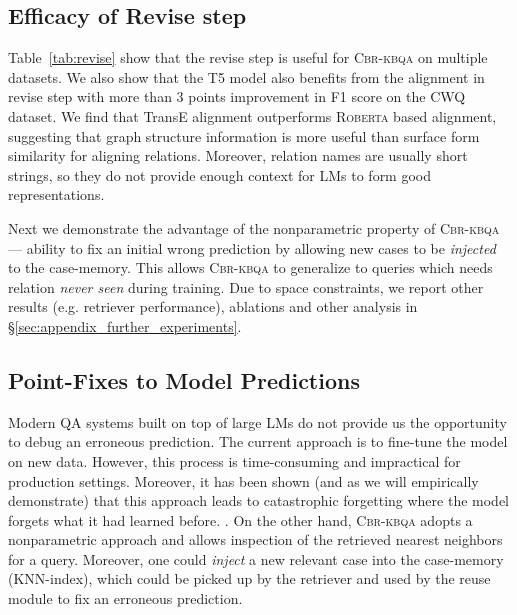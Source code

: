 \documentclass[11pt]{article}
\newcommand{\roberta}{\textsc{Roberta}\xspace}
\newcommand{\alg}{\textsc{Cbr-kbqa}\xspace}
\begin{document}
\subsection{Efficacy of Revise step}
\label{sub:revise_step}
Table~\ref{tab:revise} show that the revise step is useful for \alg on multiple datasets. We also show that the T5 model also benefits from the alignment in revise step with more than 3 points improvement in F1 score on the CWQ dataset. We find that TransE alignment outperforms \roberta based alignment, suggesting that graph structure information is more useful than surface form similarity for aligning relations. Moreover, relation names are usually short strings, so they do not provide enough context for LMs to form good representations.

Next we demonstrate the advantage of the nonparametric property of \alg --- ability to fix an initial wrong prediction by allowing new cases to be \emph{injected} to the case-memory. This allows \alg to generalize to queries which needs relation \emph{never seen} during training. Due to space constraints, we report other results (e.g. retriever performance), ablations and other analysis in \S\ref{sec:appendix_further_experiments}. 


\subsection{Point-Fixes to Model Predictions}
\label{sub:analysis}
Modern QA systems built on top of large LMs do not provide us the opportunity to debug an erroneous prediction. The current approach is to fine-tune the model on new data. However, this process is time-consuming and impractical for production settings. Moreover, it has been shown (and as we will empirically demonstrate) that this approach leads to catastrophic forgetting where the model forgets what it had learned before. \cite{mccloskey1989catastrophic,kirkpatrick2017overcoming}. On the other hand, \alg adopts a nonparametric approach and allows inspection of the retrieved nearest neighbors for a query. Moreover, one could \emph{inject} a new relevant case into the case-memory (KNN-index), which could be picked up by the retriever and used by the reuse module to fix an erroneous prediction. 
\end{document}
